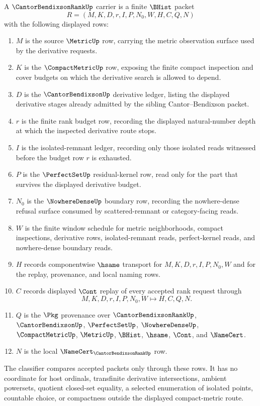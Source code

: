 \begin{definition}
\label{def:cantor-bendixson-rank-carrier}
A $\CantorBendixsonRankUp$ carrier is a finite $\BHist$ packet
$$
R=(M,K,D,r,I,P,N_0,W,H,C,Q,N)
$$
with the following displayed rows:
\begin{enumerate}
\item $M$ is the source $\MetricUp$ row, carrying the metric observation surface used by the derivative requests.
\item $K$ is the $\CompactMetricUp$ row, exposing the finite compact inspection and cover budgets on which the derivative search is allowed to depend.
\item $D$ is the $\CantorBendixsonUp$ derivative ledger, listing the displayed derivative stages already admitted by the sibling Cantor--Bendixson packet.
\item $r$ is the finite rank budget row, recording the displayed natural-number depth at which the inspected derivative route stops.
\item $I$ is the isolated-remnant ledger, recording only those isolated reads witnessed before the budget row $r$ is exhausted.
\item $P$ is the $\PerfectSetUp$ residual-kernel row, read only for the part that survives the displayed derivative budget.
\item $N_0$ is the $\NowhereDenseUp$ boundary row, recording the nowhere-dense refusal surface consumed by scattered-remnant or category-facing reads.
\item $W$ is the finite window schedule for metric neighborhoods, compact inspections, derivative rows, isolated-remnant reads, perfect-kernel reads, and nowhere-dense boundary reads.
\item $H$ records componentwise $\hsame$ transport for $M,K,D,r,I,P,N_0,W$ and for the replay, provenance, and local naming rows.
\item $C$ records displayed $\Cont$ replay of every accepted rank request through
$$
M,K,D,r,I,P,N_0,W \longmapsto H,C,Q,N .
$$
\item $Q$ is the $\Pkg$ provenance over $\CantorBendixsonRankUp$, $\CantorBendixsonUp$, $\PerfectSetUp$, $\NowhereDenseUp$, $\CompactMetricUp$, $\MetricUp$, $\BHist$, $\hsame$, $\Cont$, and $\NameCert$.
\item $N$ is the local $\NameCert_{\CantorBendixsonRankUp}$ row.
\end{enumerate}
The classifier compares accepted packets only through these rows. It has no coordinate for host ordinals, transfinite derivative intersections, ambient powersets, quotient closed-set equality, a selected enumeration of isolated points, countable choice, or compactness outside the displayed compact-metric route.
\end{definition}

